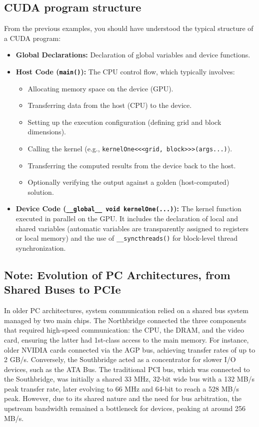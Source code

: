 \subsection{CUDA program structure}
From the previous examples, you should have understood the typical structure of a CUDA program:
\begin{itemize}
    \item \textbf{Global Declarations:} Declaration of global variables and device functions.
    \item \textbf{Host Code (\texttt{main()}):} The CPU control flow, which typically involves:
    \begin{itemize}
        \item[-] Allocating memory space on the device (GPU).
        \item[-] Transferring data from the host (CPU) to the device.
        \item[-] Setting up the execution configuration (defining grid and block dimensions).
        \item[-] Calling the kernel (e.g., \texttt{kernelOne<<<grid, block>>>(args...)}).
        \item[-] Transferring the computed results from the device back to the host.
        \item[-] Optionally verifying the output against a golden (host-computed) solution.
    \end{itemize}
    \item \textbf{Device Code (\texttt{\_\_global\_\_ void kernelOne(...)}):} The kernel function executed in parallel on the GPU. It includes the declaration of local and shared variables (automatic variables are transparently assigned to registers or local memory) and the use of \texttt{\_\_syncthreads()} for block-level thread synchronization.
\end{itemize}

\hrulefill

\subsection{Note: Evolution of PC Architectures, from Shared Buses to PCIe}

In older PC architectures, system communication relied on a shared bus system managed by two main chips. The Northbridge connected the three components that required high-speed communication: the CPU, the DRAM, and the video card, ensuring the latter had 1st-class access to the main memory. For instance, older NVIDIA cards connected via the AGP bus, achieving transfer rates of up to 2 GB/s. Conversely, the Southbridge acted as a concentrator for slower I/O devices, such as the ATA Bus. The traditional PCI bus, which was connected to the Southbridge, was initially a shared 33 MHz, 32-bit wide bus with a 132 MB/s peak transfer rate, later evolving to 66 MHz and 64-bit to reach a 528 MB/s peak. However, due to its shared nature and the need for bus arbitration, the upstream bandwidth remained a bottleneck for devices, peaking at around 256 MB/s.

